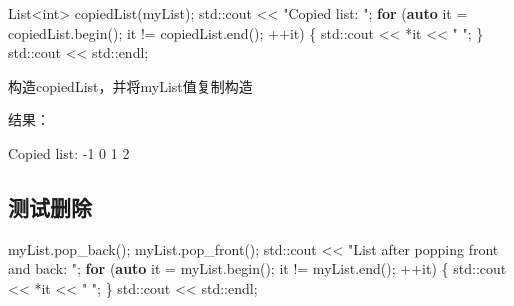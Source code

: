 \documentclass[
]{article}
\newenvironment{Shaded}{}{}
\newcommand{\BuiltInTok}[1]{\textcolor[rgb]{0.00,0.50,0.00}{#1}}
\newcommand{\ControlFlowTok}[1]{\textcolor[rgb]{0.00,0.44,0.13}{\textbf{#1}}}
\newcommand{\DataTypeTok}[1]{\textcolor[rgb]{0.56,0.13,0.00}{#1}}
\newcommand{\KeywordTok}[1]{\textcolor[rgb]{0.00,0.44,0.13}{\textbf{#1}}}
\newcommand{\NormalTok}[1]{#1}
\newcommand{\OperatorTok}[1]{\textcolor[rgb]{0.40,0.40,0.40}{#1}}
\newcommand{\StringTok}[1]{\textcolor[rgb]{0.25,0.44,0.63}{#1}}
\begin{document}
\begin{Shaded}
\begin{Highlighting}[]
\NormalTok{List}\OperatorTok{\textless{}}\DataTypeTok{int}\OperatorTok{\textgreater{}}\NormalTok{ copiedList}\OperatorTok{(}\NormalTok{myList}\OperatorTok{);}
\BuiltInTok{std::}\NormalTok{cout}\OperatorTok{ \textless{}\textless{}} \StringTok{"Copied list: "}\OperatorTok{;}
\ControlFlowTok{for} \OperatorTok{(}\KeywordTok{auto}\NormalTok{ it }\OperatorTok{=}\NormalTok{ copiedList}\OperatorTok{.}\NormalTok{begin}\OperatorTok{();}\NormalTok{ it }\OperatorTok{!=}\NormalTok{ copiedList}\OperatorTok{.}\NormalTok{end}\OperatorTok{();} \OperatorTok{++}\NormalTok{it}\OperatorTok{)} \OperatorTok{\{}
    \BuiltInTok{std::}\NormalTok{cout}\OperatorTok{ \textless{}\textless{}} \OperatorTok{*}\NormalTok{it }\OperatorTok{\textless{}\textless{}} \StringTok{" "}\OperatorTok{;}
\OperatorTok{\}}
\BuiltInTok{std::}\NormalTok{cout}\OperatorTok{ \textless{}\textless{}} \BuiltInTok{std::}\NormalTok{endl}\OperatorTok{;}
\end{Highlighting}
\end{Shaded}

构造copiedList，并将myList值复制构造

结果：

\begin{Shaded}
\begin{Highlighting}[]
\NormalTok{Copied list: {-}1 0 1 2}
\end{Highlighting}
\end{Shaded}

\hypertarget{ux6d4bux8bd5ux5220ux9664}{%
\subsection{测试删除}\label{ux6d4bux8bd5ux5220ux9664}}

\begin{Shaded}
\begin{Highlighting}[]
\NormalTok{myList}\OperatorTok{.}\NormalTok{pop\_back}\OperatorTok{();}
\NormalTok{myList}\OperatorTok{.}\NormalTok{pop\_front}\OperatorTok{();}
\BuiltInTok{std::}\NormalTok{cout}\OperatorTok{ \textless{}\textless{}} \StringTok{"List after popping front and back: "}\OperatorTok{;}
\ControlFlowTok{for} \OperatorTok{(}\KeywordTok{auto}\NormalTok{ it }\OperatorTok{=}\NormalTok{ myList}\OperatorTok{.}\NormalTok{begin}\OperatorTok{();}\NormalTok{ it }\OperatorTok{!=}\NormalTok{ myList}\OperatorTok{.}\NormalTok{end}\OperatorTok{();} \OperatorTok{++}\NormalTok{it}\OperatorTok{)} \OperatorTok{\{}
    \BuiltInTok{std::}\NormalTok{cout}\OperatorTok{ \textless{}\textless{}} \OperatorTok{*}\NormalTok{it }\OperatorTok{\textless{}\textless{}} \StringTok{" "}\OperatorTok{;}
\OperatorTok{\}}
\BuiltInTok{std::}\NormalTok{cout}\OperatorTok{ \textless{}\textless{}} \BuiltInTok{std::}\NormalTok{endl}\OperatorTok{;}
\end{Highlighting}
\end{Shaded}
\end{document}

